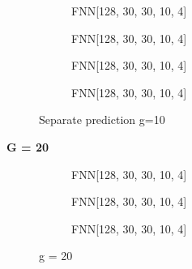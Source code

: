 \documentclass[a4paper,times,12pt]{article}
\begin{document}
\begin{figure}[H]
    \centering
    \begin{subfigure}[t]{0.45\textwidth}
		\centering
        
        \caption{FNN[128, 30, 30, 10, 4]}
		\label{fig:a}
    \end{subfigure}\hfill
    \begin{subfigure}[t]{0.45\textwidth}
		\centering
        
        \caption{FNN[128, 30, 30, 10, 4]}
		\label{fig:b}
    \end{subfigure}\hfill    
    \begin{subfigure}[t]{0.45\textwidth}
        \centering
        
        \caption{FNN[128, 30, 30, 10, 4]}
		\label{fig:c}
    \end{subfigure}\hfill
    \begin{subfigure}[t]{0.45\textwidth}
        \centering
        
        \caption{FNN[128, 30, 30, 10, 4]}
		\label{fig:c}
    \end{subfigure}
	\caption{Separate prediction  g=10}
\end{figure}

\textbf{G = 20}

\begin{figure}[H]
    \centering
    \begin{subfigure}[t]{0.45\textwidth}
		\centering
        
        \caption{FNN[128, 30, 30, 10, 4]}
		\label{fig:a}
    \end{subfigure}\hfill
    \begin{subfigure}[t]{0.45\textwidth}
		\centering
        
        \caption{FNN[128, 30, 30, 10, 4]}
		\label{fig:b}
    \end{subfigure}\hfill    
    \begin{subfigure}[t]{0.45\textwidth}
        \centering
        
        \caption{FNN[128, 30, 30, 10, 4]}
		\label{fig:c}
    \end{subfigure}
	\caption{g = 20}
\end{figure}
\end{document}
